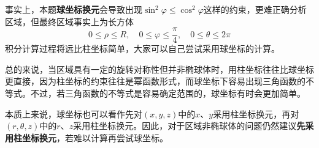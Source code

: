 \documentclass[a4paper,UTF8,fontset=windows,AutoFakeBold]{ctexart}
\theoremstyle{ex}
\begin{document}
\begin{framed}
{    事实上，本题\textbf{球坐标换元}会导致出现$\sin^2\varphi\le\cos^2\varphi$这样的约束，更难正确分析区域，但最终区域事实上为长方体
    $$0\le\rho\le R,\quad0\le\varphi\le\frac{\pi}{4},\quad0\le\theta\le2\pi$$
    积分计算过程将远比柱坐标简单，大家可以自己尝试采用球坐标的计算。
}
\end{framed}

总的来说，当区域具有一定的旋转对称性但并非椭球体时，用柱坐标往往比球坐标更直接，因为柱坐标的约束往往是幂函数形式，而球坐标下容易出现三角函数的不等式。不过，若三角函数的不等式是容易确定范围的，球坐标有时会更加简单。

本质上来说，球坐标也可以看作先对$(x,y,z)$中的$x$、$y$采用柱坐标换元，再对$(r,\theta,z)$中的$r$、$z$采用柱坐标换元。因此，对于区域非椭球体的问题仍然建议\textbf{先采用柱坐标换元}，若难以计算再尝试球坐标。
\end{document}
